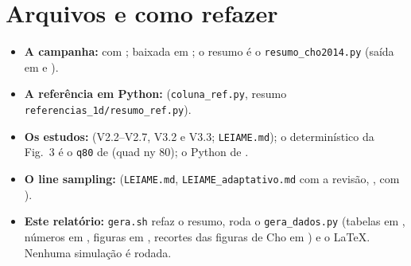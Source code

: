 \documentclass[11pt,a4paper]{article}
\begin{document}
\section{Arquivos e como refazer}\label{sec:arquivos}
\begin{itemize}
  \item \textbf{A campanha:}  com
    ; baixada em ; o resumo é o \texttt{resumo\_cho2014.py}
    (saída em  e ).
  \item \textbf{A referência em Python:}  (\texttt{coluna\_ref.py}, resumo
    \texttt{referencias\_1d/resumo\_ref.py}).
  \item \textbf{Os estudos:}  (V2.2--V2.7, V3.2 e V3.3; \texttt{LEIAME.md}); o
    determinístico da Fig.~3 é o \texttt{q80} de  (quad ny 80);
    o Python de .
  \item \textbf{O line sampling:}  (\texttt{LEIAME.md}, \texttt{LEIAME\_adaptativo.md}
    com a revisão, ,  com ).
  \item \textbf{Este relatório:} \texttt{gera.sh} refaz o resumo, roda o \texttt{gera\_dados.py} (tabelas em ,
    números em , figuras em , recortes das figuras de Cho em ) e o \LaTeX.
    Nenhuma simulação é rodada.
\end{itemize}
\end{document}
